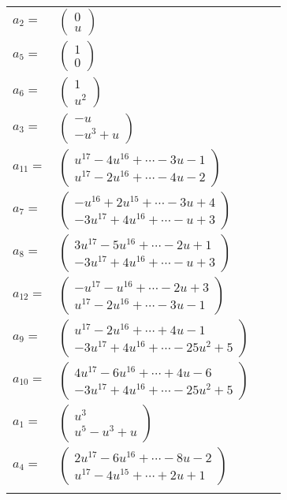 \documentclass[1p]{elsarticle_modified}
\theoremstyle{definition}
\begin{document}
\begin{tabular}{m{7pt} m{180pt} m{7pt} m{180pt} }
\flushright $a_{2}=$&$\begin{pmatrix}0\\u\end{pmatrix}$ \\
\flushright $a_{5}=$&$\begin{pmatrix}1\\0\end{pmatrix}$ \\
\flushright $a_{6}=$&$\begin{pmatrix}1\\u^2\end{pmatrix}$ \\
\flushright $a_{3}=$&$\begin{pmatrix}- u\\- u^3+u\end{pmatrix}$ \\
\flushright $a_{11}=$&$\begin{pmatrix}u^{17}-4 u^{16}+\cdots-3 u-1\\u^{17}-2 u^{16}+\cdots-4 u-2\end{pmatrix}$ \\
\flushright $a_{7}=$&$\begin{pmatrix}- u^{16}+2 u^{15}+\cdots-3 u+4\\-3 u^{17}+4 u^{16}+\cdots- u+3\end{pmatrix}$ \\
\flushright $a_{8}=$&$\begin{pmatrix}3 u^{17}-5 u^{16}+\cdots-2 u+1\\-3 u^{17}+4 u^{16}+\cdots- u+3\end{pmatrix}$ \\
\flushright $a_{12}=$&$\begin{pmatrix}- u^{17}- u^{16}+\cdots-2 u+3\\u^{17}-2 u^{16}+\cdots-3 u-1\end{pmatrix}$ \\
\flushright $a_{9}=$&$\begin{pmatrix}u^{17}-2 u^{16}+\cdots+4 u-1\\-3 u^{17}+4 u^{16}+\cdots-25 u^2+5\end{pmatrix}$ \\
\flushright $a_{10}=$&$\begin{pmatrix}4 u^{17}-6 u^{16}+\cdots+4 u-6\\-3 u^{17}+4 u^{16}+\cdots-25 u^2+5\end{pmatrix}$ \\
\flushright $a_{1}=$&$\begin{pmatrix}u^3\\u^5- u^3+u\end{pmatrix}$ \\
\flushright $a_{4}=$&$\begin{pmatrix}2 u^{17}-6 u^{16}+\cdots-8 u-2\\u^{17}-4 u^{15}+\cdots+2 u+1\end{pmatrix}$\\&\end{tabular}
\end{document}
